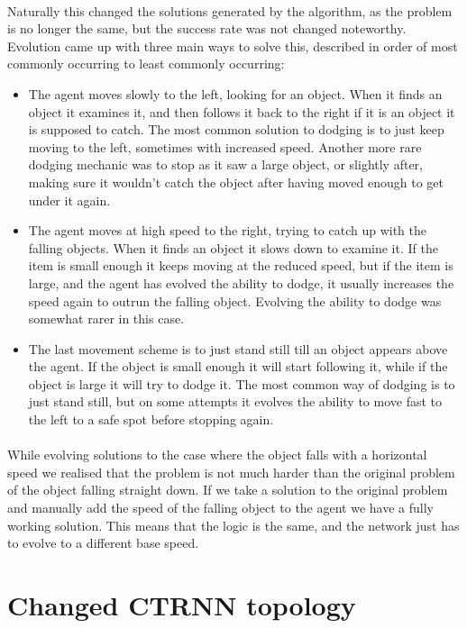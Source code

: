 \documentclass[a4paper,12pt]{article}
\begin{document}
\paragraph{}Naturally this changed the solutions generated by the algorithm, as the problem is no longer the same, but the success rate was not changed noteworthy. Evolution came up with three main ways to solve this, described in order of most commonly occurring to least commonly occurring:
\begin{itemize}
\item{The agent moves slowly to the left, looking for an object. When it finds an object it examines it, and then follows it back to the right if it is an object it is supposed to catch. The most common solution to dodging is to just keep moving to the left, sometimes with increased speed. Another more rare dodging mechanic was to stop as it saw a large object, or slightly after, making sure it wouldn't catch the object after having moved enough to get under it again.}
\item{The agent moves at high speed to the right, trying to catch up with the falling objects. When it finds an object it slows down to examine it. If the item is small enough it keeps moving at the reduced speed, but if the item is large, and the agent has evolved the ability to dodge, it usually increases the speed again to outrun the falling object. Evolving the ability to dodge was somewhat rarer in this case.}
\item{The last movement scheme is to just stand still till an object appears above the agent. If the object is small enough it will start following it, while if the object is large it will try to dodge it. The most common way of dodging is to just stand still, but on some attempts it evolves the ability to move fast to the left to a safe spot before stopping again.}
\end{itemize}
\paragraph{}While evolving solutions to the case where the object falls with a horizontal speed we realised that the problem is not much harder than the original problem of the object falling straight down. If we take a solution to the original problem and manually add the speed of the falling object to the agent we have a fully working solution. This means that the logic is the same, and the network just has to evolve to a different base speed.

\section{Changed CTRNN topology}
\end{document}
